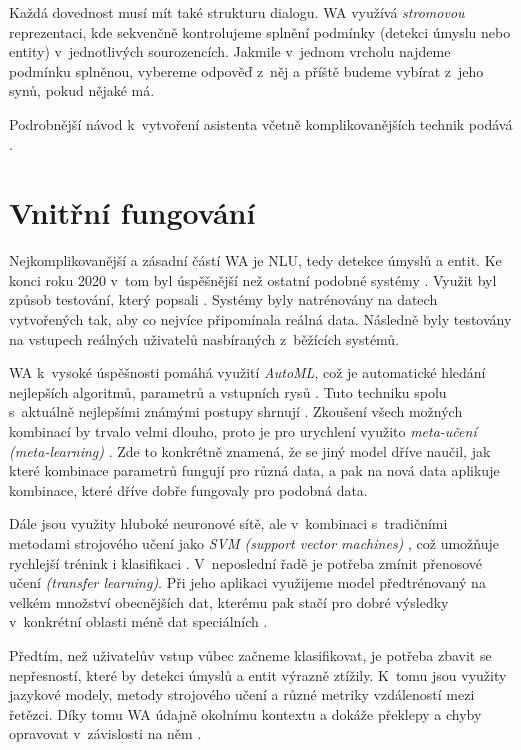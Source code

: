 Každá dovednost musí mít také strukturu dialogu.
WA využívá \textit{stromovou} reprezentaci,
kde sekvenčně kontrolujeme splnění podmínky (detekci úmyslu nebo entity)
v~jednotlivých sourozencích. Jakmile v~jednom vrcholu najdeme podmínku
splněnou, vybereme
odpověď z~něj a příště budeme vybírat z~jeho synů, pokud nějaké má.

Podrobnější návod k~vytvoření asistenta včetně komplikovanějších
technik podává \citet{akbulut_common_2020}.

\section{Vnitřní fungování}\label{wa-inside}

Nejkomplikovanější a zásadní částí WA je NLU, tedy detekce úmyslů
a entit. Ke konci roku 2020 v~tom byl úspěšnější než ostatní podobné
systémy \citep{qi2021benchmarking}. Využit byl způsob testování,
který popsali \citet{arora-etal-2020-hint3}. Systémy byly natrénovány
na datech vytvořených tak, aby co nejvíce připomínala reálná data.
Následně byly testovány na vstupech reálných uživatelů nasbíraných
z~běžících systémů.

WA k~vysoké úspěšnosti pomáhá využití \textit{AutoML}, což je
automatické hledání nejlepších algoritmů,
parametrů a vstupních rysů \citep{noauthor_watson_2020}. Tuto techniku
spolu s~aktuálně nejlepšími známými postupy shrnují \citet[duben]{He_2021}.
Zkoušení všech
možných kombinací by trvalo velmi dlouho, proto je pro urychlení
využito \textit{meta-učení (meta-learning)} \citep{hospedales2020metalearning}.
Zde to konkrétně znamená, že se jiný model dříve naučil, jak které
kombinace parametrů fungují pro
různá data, a pak na nová data aplikuje kombinace, které dříve dobře
fungovaly pro podobná data.

Dále jsou využity hluboké neuronové sítě, ale v~kombinaci s~tradičními
metodami strojového učení jako \textit{SVM (support vector machines)}
\citep{bosertraining}, což umožňuje
rychlejší trénink i klasifikaci \citep{potdar_watson_2021}. V~neposlední
řadě je potřeba zmínit přenosové učení \textit{(transfer learning)}. Při
jeho aplikaci využijeme model předtrénovaný
na velkém množství obecnějších dat, kterému pak stačí pro dobré výsledky
v~konkrétní oblasti méně dat speciálních \citep{zhuang2020comprehensive}.

Předtím, než uživatelův vstup vůbec začneme klasifikovat,
je potřeba zbavit se nepřesností, které by detekci úmyslů a entit výrazně ztížily.
K~tomu jsou využity jazykové modely, metody strojového učení a
různé metriky vzdáleností mezi řetězci. Díky tomu WA údajně 
okolnímu kontextu a dokáže překlepy a chyby opravovat v~závislosti
na něm \citep{mason_ahnouncing_2019}.